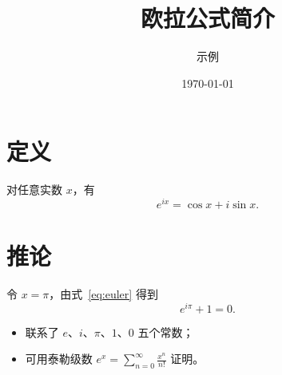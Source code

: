 \documentclass[11pt]{article}
\title{欧拉公式简介}
\author{示例}
\date{\today}
\begin{document}
\maketitle

\section{定义}
对任意实数 $x$，有
\begin{equation}
  e^{ix} = \cos x + i \sin x .
  \label{eq:euler}
\end{equation}

\section{推论}
令 $x = \pi$，由式~\eqref{eq:euler} 得到
\[
  e^{i\pi} + 1 = 0 .
\]

\begin{itemize}
  \item 联系了 $e$、$i$、$\pi$、$1$、$0$ 五个常数；
  \item 可用泰勒级数 $\displaystyle e^x = \sum_{n=0}^{\infty} \frac{x^n}{n!}$ 证明。
\end{itemize}
\end{document}
